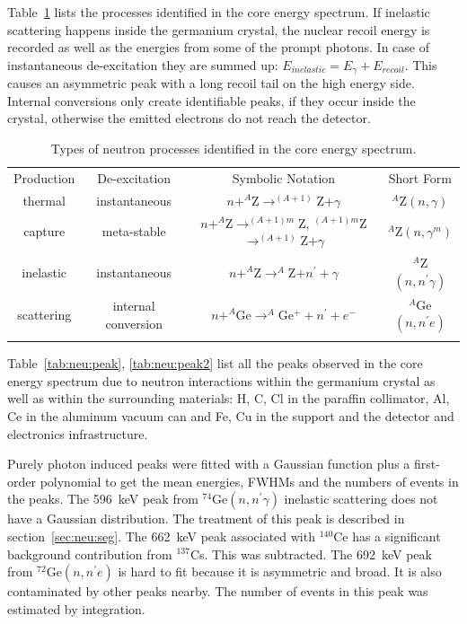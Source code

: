 Table~\ref{tab:neu:type} lists the processes identified in the core energy spectrum. If inelastic scattering happens inside the germanium crystal, the nuclear recoil energy is recorded as well as the energies from some of the prompt photons. In case of instantaneous de-excitation they are summed up: $E_{inelastic} = E_{\gamma} + E_{recoil}$. This causes an asymmetric peak with a long recoil tail on the high energy side. Internal conversions only create identifiable peaks, if they occur inside the crystal, otherwise the emitted electrons do not reach the detector.

\begin{table}[tbhp]
  \caption{Types of neutron processes identified in the core energy
    spectrum.}
  \label{tab:neu:type}\centering
  \begin{tabular*}{\textwidth}{@{\extracolsep{\fill}}cccc}
    \hline\noalign{\smallskip}
    Production & De-excitation & Symbolic Notation & Short Form \\
    \noalign{\smallskip}\hline\noalign{\smallskip}
    thermal & instantaneous & $n + ^A$Z$ \rightarrow ^{(A+1)}$Z$ +
\gamma$ & $^A$Z$(n,\gamma)$\\
    \noalign{\smallskip}\cline{2-4}\noalign{\smallskip}
    capture & meta-stable 
    & $n + ^A$Z$ \rightarrow ^{(A+1)m}$Z, $^{(A+1)m}$Z$ \rightarrow
^{(A+1)}$Z$+\gamma$ & $^A$Z$(n,\gamma^{m})$\\
    \noalign{\smallskip}\hline\noalign{\smallskip}
    inelastic & instantaneous & 
    $n + ^A$Z$ \rightarrow ^A$Z$ + n^\prime + \gamma$ &
$^A$Z$(n,n^\prime\gamma)$\\
    \noalign{\smallskip}\cline{2-4}\noalign{\smallskip}
    scattering & internal conversion & 
    $n + ^A$Ge$ \rightarrow ^A$Ge$^{+} + n^\prime + e^-$ &
$^A$Ge$(n,n^\prime e)$\\
    \noalign{\smallskip}\hline
  \end{tabular*}
\end{table}

Table~\ref{tab:neu:peak}, \ref{tab:neu:peak2} list all the peaks observed in the core energy spectrum due to neutron interactions within the germanium crystal as well as within the surrounding materials: H, C, Cl in the paraffin collimator, Al, Ce in the aluminum vacuum can and Fe, Cu in the support and the detector and electronics infrastructure.

Purely photon induced peaks were fitted with a Gaussian function plus a first-order polynomial to get the mean energies, FWHMs and the numbers of events in the peaks. The 596~keV peak from $^{74}$Ge$(n, n^\prime \gamma)$ inelastic scattering does not have a Gaussian distribution. The treatment of this peak is described in section~\ref{sec:neu:seg}. The 662~keV peak associated with $^{140}$Ce has a significant background contribution from $^{137}$Cs. This was subtracted. The 692~keV peak from $^{72}$Ge$(n,n^\prime e)$ is hard to fit because it is asymmetric and broad. It is also contaminated by other peaks nearby. The number of events in this peak was estimated by integration.

